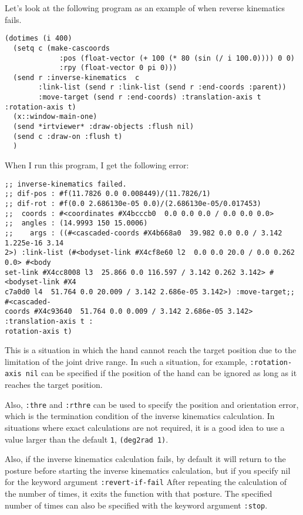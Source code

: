 Let's look at the following program as an example of when reverse kinematics fails.
{\baselineskip=10pt
\begin{verbatim}
(dotimes (i 400)
  (setq c (make-cascoords
             :pos (float-vector (+ 100 (* 80 (sin (/ i 100.0)))) 0 0)
             :rpy (float-vector 0 pi 0)))
  (send r :inverse-kinematics  c
        :link-list (send r :link-list (send r :end-coords :parent))
        :move-target (send r :end-coords) :translation-axis t  :rotation-axis t)
  (x::window-main-one)
  (send *irtviewer* :draw-objects :flush nil)
  (send c :draw-on :flush t)
  )
\end{verbatim}
}

When I run this program, I get the following error:
{\baselineskip=10pt
\begin{verbatim}
;; inverse-kinematics failed.
;; dif-pos : #f(11.7826 0.0 0.008449)/(11.7826/1)
;; dif-rot : #f(0.0 2.686130e-05 0.0)/(2.686130e-05/0.017453)
;;  coords : #<coordinates #X4bcccb0  0.0 0.0 0.0 / 0.0 0.0 0.0>
;;  angles : (14.9993 150 15.0006)
;;    args : ((#<cascaded-coords #X4b668a0  39.982 0.0 0.0 / 3.142 1.225e-16 3.14
2>) :link-list (#<bodyset-link #X4cf8e60 l2  0.0 0.0 20.0 / 0.0 0.262 0.0> #<body
set-link #X4cc8008 l3  25.866 0.0 116.597 / 3.142 0.262 3.142> #<bodyset-link #X4
c7a0d0 l4  51.764 0.0 20.009 / 3.142 2.686e-05 3.142>) :move-target;; #<cascaded-
coords #X4c93640  51.764 0.0 0.009 / 3.142 2.686e-05 3.142> :translation-axis t :
rotation-axis t)
\end{verbatim}
}

This is a situation in which the hand cannot reach the target position due to the limitation of the joint drive range.
In such a situation, for example, \verb|:rotation-axis nil| can be specified if the position of the hand can be ignored as long as it reaches the target position.

Also, \verb|:thre| and \verb|:rthre| can be used to specify the position and orientation error, which is the termination condition of the inverse kinematics calculation. In situations where exact calculations are not required, it is a good idea to use a value larger than the default \verb|1|, \verb|(deg2rad 1)|.

Also, if the inverse kinematics calculation fails, by default it will return to the posture before starting the inverse kinematics calculation, but if you specify nil for the keyword argument \verb|:revert-if-fail| After repeating the calculation of the number of times, it exits the function with that posture. The specified number of times can also be specified with the keyword argument \verb|:stop|.

